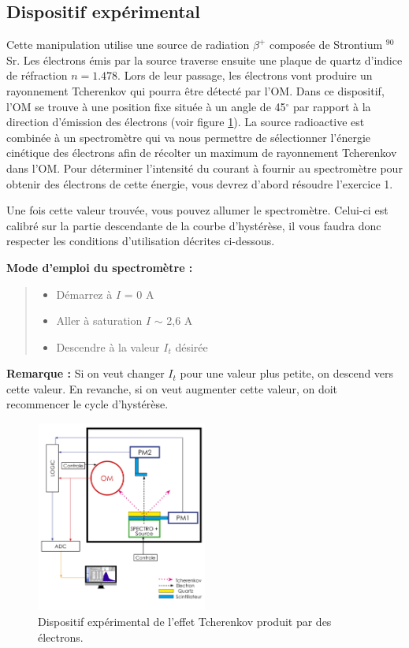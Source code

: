 \subsection{Dispositif expérimental}
Cette manipulation utilise une source de radiation $\beta^+$ composée de Strontium $^{90}$Sr. Les électrons émis par la source traverse ensuite une plaque de quartz d'indice de réfraction  $n = 1.478$. Lors de leur passage, les électrons vont produire un rayonnement Tcherenkov qui pourra être détecté par l'OM. Dans ce dispositif, l'OM se trouve à une position fixe située à un angle de 45$^{\circ}$ par rapport à la direction d'émission des électrons (voir figure \ref{fig:dispo1}). La source radioactive est combinée à un spectromètre qui va nous permettre de sélectionner l'énergie cinétique des électrons afin de récolter un maximum de rayonnement Tcherenkov dans l'OM. Pour déterminer l'intensité du courant à fournir au spectromètre pour obtenir des électrons de cette énergie, vous devrez d'abord résoudre l'exercice 1.

Une fois cette valeur trouvée, vous pouvez allumer le spectromètre. Celui-ci est calibré sur la partie descendante de la courbe d'hystérèse, il vous faudra donc respecter les conditions d'utilisation décrites ci-dessous.

\textbf{Mode d'emploi du spectromètre :}
\begin{quote}
    \begin{itemize}
        \item Démarrez à $I$ = 0 A
        \item Aller à saturation $I$ $\sim$ 2,6 A
        \item Descendre à la valeur $I_t$ désirée
    \end{itemize}
\end{quote}
\textbf{Remarque :} Si on veut changer $I_t$ pour une valeur plus petite, on descend vers cette valeur. En revanche, si on veut augmenter cette valeur, on doit recommencer le cycle d'hystérèse. 

\begin{figure}
    \centering
    \includegraphics[width=0.5\textwidth]{figures/Dispositif_1.png}
    \caption{Dispositif expérimental de l'effet Tcherenkov produit par des électrons.}
    \label{fig:dispo1} 
\end{figure}

